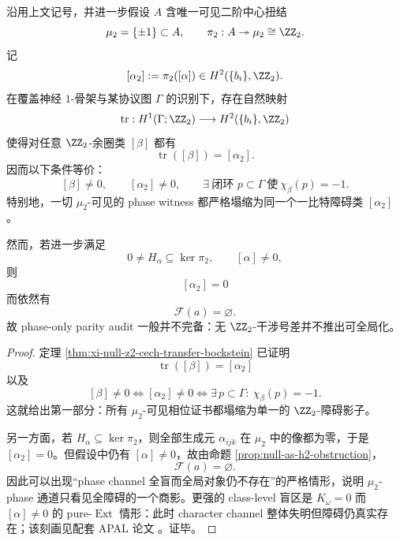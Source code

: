 \begin{theorem}\label{thm:conclusion-observer-phase-shadow-onebit-collapse-incompleteness}
沿用上文记号，并进一步假设 \(A\) 含唯一可见二阶中心扭结
\[
\mu_2=\{\pm 1\}\subset A,
\qquad
\pi_2:A\twoheadrightarrow \mu_2\cong \ZZ_2.
\]
记
\[
[\alpha_2]:=\pi_2([\alpha])\in H^2(\{b_i\},\ZZ_2).
\]
在覆盖神经 \(1\)-骨架与某协议图 \(\Gamma\) 的识别下，存在自然映射
\[
\operatorname{tr}:H^1(\Gamma;\ZZ_2)\longrightarrow H^2(\{b_i\},\ZZ_2)
\]
使得对任意 \(\ZZ_2\)-余圈类 \([\beta]\) 都有
\[
\operatorname{tr}([\beta])=[\alpha_2].
\]
因而以下条件等价：
\[
[\beta]\neq 0,
\qquad
[\alpha_2]\neq 0,
\qquad
\exists\ \text{闭环 }p\subset \Gamma\ \text{使}\ \chi_\beta(p)=-1.
\]
特别地，一切 \(\mu_2\)-可见的 phase witness 都严格塌缩为同一个一比特障碍类 \([\alpha_2]\)。

然而，若进一步满足
\[
0\neq H_\alpha\subseteq \ker \pi_2,
\qquad
[\alpha]\neq 0,
\]
则
\[
[\alpha_2]=0
\]
而依然有
\[
\mathscr F(a)=\varnothing.
\]
故 phase-only parity audit 一般并不完备：无 \(\ZZ_2\)-干涉号差并不推出可全局化。
\end{theorem}

\begin{proof}
定理 \ref{thm:xi-null-z2-cech-transfer-bockstein} 已证明
\[
\operatorname{tr}([\beta])=[\alpha_2]
\]
以及
\[
[\beta]\neq 0
\iff
[\alpha_2]\neq 0
\iff
\exists\, p\subset \Gamma:\ \chi_\beta(p)=-1.
\]
这就给出第一部分：所有 \(\mu_2\)-可见相位证书都塌缩为单一的 \(\ZZ_2\)-障碍影子。

另一方面，若 \(H_\alpha\subseteq \ker\pi_2\)，则全部生成元 \(\alpha_{ijk}\) 在 \(\mu_2\) 中的像都为零，于是 \([\alpha_2]=0\)。但假设中仍有 \([\alpha]\neq 0\)，故由命题 \ref{prop:null-as-h2-obstruction}，
\[
\mathscr F(a)=\varnothing.
\]
因此可以出现“phase channel 全盲而全局对象仍不存在”的严格情形，说明 \(\mu_2\)-phase 通道只看见全障碍的一个商影。更强的 class-level 盲区是 \(K_\omega=0\) 而 \([\alpha]\neq 0\) 的 pure-\(\operatorname{Ext}\) 情形：此时 character channel 整体失明但障碍仍真实存在；该刻画见配套 APAL 论文 \cite{MaZhang2026StateForcingSemantics}。证毕。
\end{proof}

